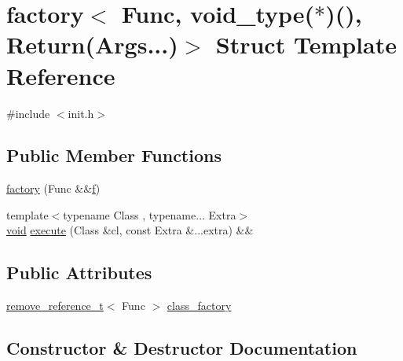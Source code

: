 \hypertarget{structfactory_3_01_func_00_01void__type_07_5_08_07_08_00_01_return_07_args_8_8_8_08_4}{}\section{factory$<$ Func, void\+\_\+type($\ast$)(), Return(Args...)$>$ Struct Template Reference}
\label{structfactory_3_01_func_00_01void__type_07_5_08_07_08_00_01_return_07_args_8_8_8_08_4}


{\ttfamily \#include $<$init.\+h$>$}

\subsection*{Public Member Functions}
\begin{DoxyCompactItemize}
\item 
\mbox{\hyperlink{structfactory_3_01_func_00_01void__type_07_5_08_07_08_00_01_return_07_args_8_8_8_08_4_af53b06b3e6873e503aaf870abeb8c04a}{factory}} (Func \&\&\mbox{\hyperlink{_s_d_l__opengl__glext_8h_a691492ec0bd6383f91200e49f6ae40ed}{f}})
\item 
{\footnotesize template$<$typename Class , typename... Extra$>$ }\\\mbox{\hyperlink{_s_d_l__opengles2__gl2ext_8h_ae5d8fa23ad07c48bb609509eae494c95}{void}} \mbox{\hyperlink{structfactory_3_01_func_00_01void__type_07_5_08_07_08_00_01_return_07_args_8_8_8_08_4_a044edcce660aca30e7fa2aff4c1ce4ba}{execute}} (Class \&cl, const Extra \&...extra) \&\&
\end{DoxyCompactItemize}
\subsection*{Public Attributes}
\begin{DoxyCompactItemize}
\item 
\mbox{\hyperlink{detail_2common_8h_a3a08cea569e6926ac8d7d74dd7178b5f}{remove\+\_\+reference\+\_\+t}}$<$ Func $>$ \mbox{\hyperlink{structfactory_3_01_func_00_01void__type_07_5_08_07_08_00_01_return_07_args_8_8_8_08_4_a0189b962378d0f232a6d7495fe687e97}{class\+\_\+factory}}
\end{DoxyCompactItemize}


\subsection{Constructor \& Destructor Documentation}
\mbox{\label{structfactory_3_01_func_00_01void__type_07_5_08_07_08_00_01_return_07_args_8_8_8_08_4_af53b06b3e6873e503aaf870abeb8c04a}} 
